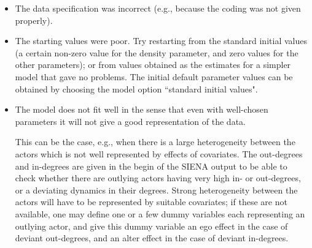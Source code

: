 \documentclass[a4paper,fleqn,11pt]{article}
\newcommand{\+}{\, + \,}
\newcommand{\SI}{{\sf SIENA }}
\begin{document}
\begin{itemize}
\item The data specification was incorrect (e.g., because the coding
      was not given properly).
\item The starting values were poor.
      Try restarting from the standard initial values
      (a certain non-zero value for the
      density parameter, and zero values for the other parameters);
      or from values obtained as the estimates for a simpler model
      that gave no problems.
      The initial default parameter values can be obtained
      by choosing the model option ``standard initial values".

\item The model does not fit well in the sense that even with well-chosen
      parameters it will not give a good representation of the data.

      This can be the case, e.g., when there is a large heterogeneity
      between the actors which is not well represented by effects
      of covariates.
      The out-degrees and in-degrees are given in the begin of the \SI output
      to be able to check whether there are outlying actors having very high
      in- or out-degrees, or a deviating dynamics in their degrees.
      Strong heterogeneity between the actors will have to be
      represented by suitable covariates; if these are not available,
      one may define one or a few dummy variables each representing
      an outlying actor, and give this dummy variable an ego effect
      in the case of deviant out-degrees, and an alter effect in the
      case of deviant in-degrees.


\end{itemize}
\end{document}
